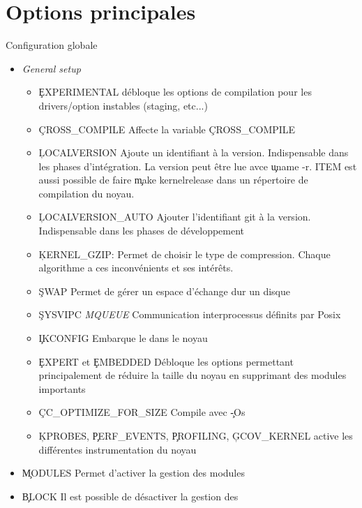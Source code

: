 \section{Options principales}
\begin{frame}[fragile=singleslide]{Configuration globale}
  \begin{itemize} 
  \item \emph{General setup}
    \begin{itemize} 
    \item  \c{EXPERIMENTAL} débloque les  options de  compilation pour
      les drivers/option instables (staging, etc...)
    \item \c{CROSS_COMPILE} Affecte la variable \c{CROSS_COMPILE}
    \item    \c{LOCALVERSION}    Ajoute    un   identifiant    à    la
      version. Indispensable dans les phases d'intégration. La version
      peut  être lue  avce \c{uname  -r}. ITEM  est aussi  possible de
      faire \c{make  kernelrelease} dans un  répertoire de compilation
      du noyau.
    \item  \c{LOCALVERSION_AUTO}   Ajouter  l'identifiant  git   à  la
      version. Indispensable dans les phases de développement
    \item   \c{KERNEL_GZIP}:   Permet    de   choisir   le   type   de
      compression.  Chaque  algorithme  a  ces  inconvénients  et  ses
      intérêts. 
    \item \c{SWAP} Permet de gérer un espace d'échange dur un disque
    \item   \c{SYSVIPC}  \emph{MQUEUE}   Communication  interprocessus
      définits par Posix
    \item \c{IKCONFIG} Embarque le  dans le noyau 
    \item \c{EXPERT}  et \c{EMBEDDED} Débloque  les options permettant
      principalement de  réduire la taille du noyau  en supprimant des
      modules importants
    \item \c{CC_OPTIMIZE_FOR_SIZE} Compile avec \c{-Os}
    \item \c{KPROBES}, \c{PERF_EVENTS}, \c{PROFILING}, \c{GCOV_KERNEL}
      active les différentes instrumentation du noyau
    \end{itemize} 
  \item \c{MODULES} Permet d'activer la gestion des modules
  \item  \c{BLOCK}  Il  est  possible  de désactiver  la  gestion  des

\end{itemize}
\end{frame}
